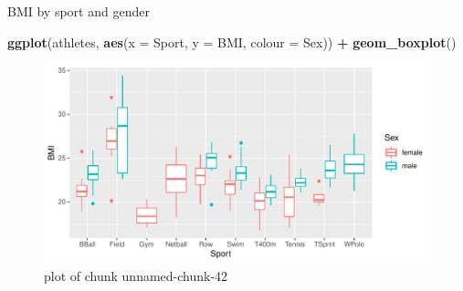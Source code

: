 \documentclass[ignorenonframetext,]{beamer}
\newenvironment{Shaded}{\begin{snugshade}}{\end{snugshade}}
\newcommand{\DataTypeTok}[1]{\textcolor[rgb]{0.13,0.29,0.53}{#1}}
\newcommand{\KeywordTok}[1]{\textcolor[rgb]{0.13,0.29,0.53}{\textbf{#1}}}
\newcommand{\NormalTok}[1]{#1}
\newcommand{\OperatorTok}[1]{\textcolor[rgb]{0.81,0.36,0.00}{\textbf{#1}}}
\newcommand{\StringTok}[1]{\textcolor[rgb]{0.31,0.60,0.02}{#1}}
\begin{document}
\begin{frame}[fragile]{BMI by sport and gender}
\protect\hypertarget{bmi-by-sport-and-gender}{}

\begin{Shaded}
\begin{Highlighting}[]
\KeywordTok{ggplot}\NormalTok{(athletes, }\KeywordTok{aes}\NormalTok{(}\DataTypeTok{x =}\NormalTok{ Sport, }\DataTypeTok{y =}\NormalTok{ BMI, }\DataTypeTok{colour =}\NormalTok{ Sex)) }\OperatorTok{+}
\StringTok{  }\KeywordTok{geom_boxplot}\NormalTok{()}
\end{Highlighting}
\end{Shaded}

\begin{figure}
\centering
\includegraphics{figure/unnamed-chunk-42-1.pdf}
\caption{plot of chunk unnamed-chunk-42}
\end{figure}

\end{frame}
\end{document}
